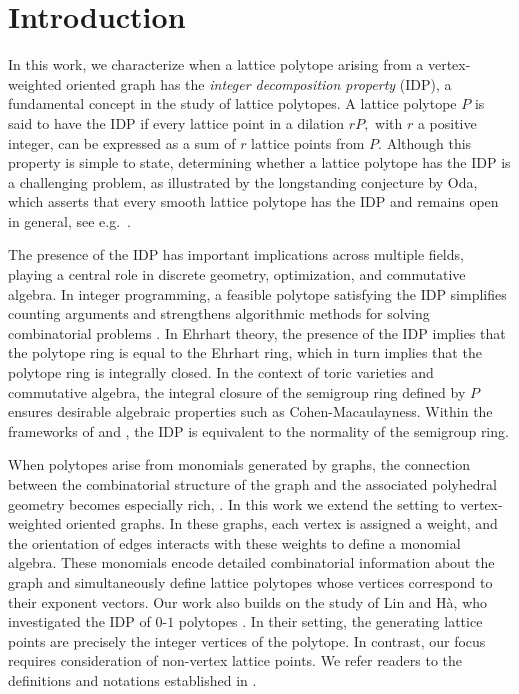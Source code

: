 \documentclass [12pt,a4paper,reqno]{amsart}
\theoremstyle{plain}
\theoremstyle{definition}
\newtheorem{Assumptions and Discussion}[Theorem]{Assumptions and Discussion}
\theoremstyle{remark}
\begin{document}




\section{Introduction}
In this work, we characterize when a lattice polytope arising from a vertex-weighted oriented graph has the \emph{integer decomposition property} (IDP), a fundamental concept in the study of lattice polytopes. A lattice polytope $P$ is said to have the IDP if every lattice point in a dilation $rP,$ with $r$ a positive integer, can be expressed as a sum of $r$ lattice points from $P$. Although this property is simple to state, determining whether a lattice polytope has the IDP is a challenging problem, as illustrated by the longstanding conjecture by Oda, which asserts that every smooth lattice polytope has the IDP and remains open in general, see e.g.\ \cite{Beck}. 


The presence of the IDP has important implications across multiple fields, playing a central role in discrete geometry, optimization, and commutative algebra. In integer programming, a feasible polytope satisfying the IDP simplifies counting arguments and strengthens algorithmic methods for solving combinatorial problems \cite[Chapter 22]{Schrijver1998}. In Ehrhart theory, the presence of the IDP implies that the polytope ring is equal to the Ehrhart ring, which in turn implies that the polytope ring is integrally closed. In the context of toric varieties and commutative algebra, the integral closure of the semigroup ring defined by $P$ ensures desirable algebraic properties such as Cohen-Macaulayness. Within the frameworks of \cite{higashitani2013minkowski} and \cite[Chapter~13]{Sturmfels1996}, the IDP is equivalent to the normality of the semigroup ring.

When polytopes arise from monomials generated by graphs, the connection between the combinatorial structure of the graph and the associated polyhedral geometry becomes especially rich, \cite{OhsugiHibi2003}. In this work we extend the setting to vertex-weighted oriented graphs. In these graphs, each vertex is assigned a weight, and the orientation of edges interacts with these weights to define a monomial algebra. These monomials encode detailed combinatorial information about the graph and simultaneously define lattice polytopes whose vertices correspond to their exponent vectors. Our work also builds on the study of Lin and H\`a, who investigated the IDP of $0$-$1$ polytopes \cite{HL}. In their setting, the generating lattice points are precisely the integer vertices of the polytope. In contrast, our focus requires consideration of non-vertex lattice points. We refer readers to the definitions and notations established in .
\end{document}
